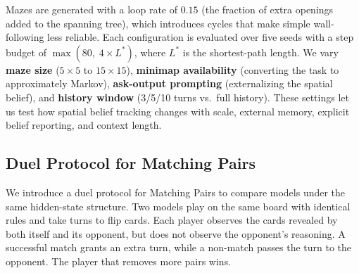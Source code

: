 Mazes are generated with a loop rate of $0.15$ (the fraction of extra openings added to the spanning tree), which introduces cycles that make simple wall-following less reliable. Each configuration is evaluated over five seeds with a step budget of $\max(80,\;4{\times}L^*)$, where $L^*$ is the shortest-path length. We vary \textbf{maze size} ($5{\times}5$ to $15{\times}15$), \textbf{minimap availability} (converting the task to approximately Markov), \textbf{ask-output prompting} (externalizing the spatial belief), and \textbf{history window} (3/5/10 turns vs.\ full history). These settings let us test how spatial belief tracking changes with scale, external memory, explicit belief reporting, and context length.

\subsection{Duel Protocol for Matching Pairs}
\label{sec:duel_protocol}



We introduce a duel protocol for Matching Pairs to compare models under the same hidden-state structure. Two models play on the same board with identical rules and take turns to flip cards. Each player observes the cards revealed by both itself and its opponent, but does not observe the opponent's reasoning. A successful match grants an extra turn, while a non-match passes the turn to the opponent. The player that removes more pairs wins.


